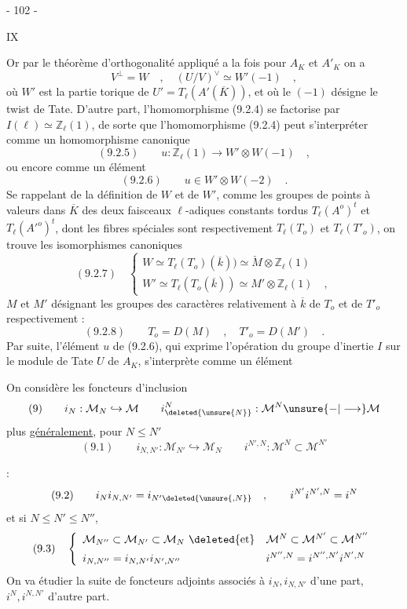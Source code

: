 
\begin{center}- 102 -\end{center}\hfill IX

Or par le théorème d'orthogonalité appliqué a la fois pour $A_K$ et $A'_K$ on a
\[
V^\perp=W\quad,\quad(U/V)^\vee\simeq W'(-1)\quad,
\]
où $W'$ est la partie torique de $U'=T_\ell(A'(\overline K))$, et où le $(-1)$ désigne le twist de Tate. D'autre part, l'homomorphisme (9.2.4) se factorise par $I(\ell)\simeq\mathbb Z_\ell(1)$, de sorte que l'homomorphisme (9.2.4) peut s'interpréter comme un homomorphisme canonique
\[
(9.2.5)\qquad u:\mathbb Z_\ell(1)\longrightarrow W'\otimes W(-1)\quad,
\]
ou encore comme un élément
\[
(9.2.6)\qquad u\in W'\otimes W(-2)\quad.
\]
Se rappelant de la définition de $W$ et de $W'$, comme les groupes de points à valeurs dans $\overline K$ des deux faisceaux $\ell$-adiques constants tordus $T_\ell(A^o)^t$ et $T_\ell(A'^o)^t$, dont les fibres spéciales sont respectivement $T_\ell(T_o)$ et $T_\ell(T'_o)$, on trouve les isomorphismes canoniques
\[
(9.2.7)\quad\left\{\begin{array}{l}
W\simeq T_\ell(T_o)(\overline k))\simeq\check M\otimes\mathbb Z_\ell(1)\\[1.5ex]
W'\simeq T_\ell(T_o(\overline k))\simeq M'\otimes\mathbb Z_\ell(1)\quad,
\end{array}\right.
\]
$M$ et $M'$ désignant les groupes des caractères relativement à $\overline k$ de $T_o$ et de $T'_o$ respectivement :
\[
(9.2.8)\qquad T_o=D(M)\quad,\quad T'_o=D(M')\quad.
\]
Par suite, l'élément $u$ de (9.2.6), qui exprime l'opération du groupe d'inertie $I$ sur le module de Tate $U$ de $A_K$, s'interprète comme un élément


On considère les foncteurs d'inclusion
\[
(9)\qquad i_N:\mathcal M_N\hookrightarrow\mathcal M\qquad
 i^N_{\deleted{\unsure{N}}}:\mathcal M^N\unsure{-|\longrightarrow}\mathcal M
\]
plus \uline{généralement}, pour $N\leq N'$
\[
(9.1)\qquad i_{N,N'}:\mathcal M_{N'}\hookrightarrow\mathcal M_N\qquad
 i^{N',N}:\mathcal M^N\subset\mathcal M^{N'}
\]

 :
\[
(9.2)\qquad i_Ni_{N,N'}=i_{N'\deleted{\unsure{,N}}}\quad,\qquad
 i^{N'}i^{N',N}=i^N
\]
 et si $N\leq N'\leq N''$,\quad {} 
\[
(9.3)\quad\left\{\begin{array}{ll}
\mathcal M_{N''}\subset\mathcal M_{N'}\subset\mathcal M_N\ \deleted{\text{et}}&\mathcal M^N\subset\mathcal M^{N'}\subset\mathcal M^{N''}\\[1ex]
i_{N,N''}=i_{N,N'}i_{N',N''}&i^{N'',N}=i^{N'',N'}i^{N',N}
\end{array}\right.
\]
On va étudier la suite de foncteurs adjoints associés à $i_N,i_{N,N'}$ d'une part, $i^N,i^{N,N'}$ d'autre part.

